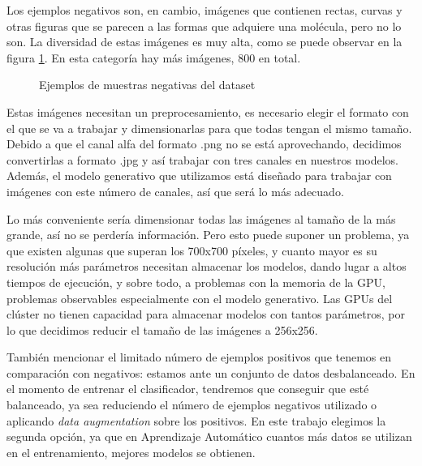 Los ejemplos negativos son, en cambio, imágenes que contienen rectas, curvas y otras figuras que se parecen a las formas que adquiere una molécula, pero no lo son. La diversidad de estas imágenes es muy alta, como se puede observar en la figura \ref{fig:negative_examples}. En esta categoría hay más imágenes, 800 en total.

\begin{figure}[H]
\centering
    \caption{Ejemplos de muestras negativas del dataset}
    \label{fig:negative_examples}
\end{figure}

Estas imágenes necesitan un preprocesamiento, es necesario elegir el formato con el que se va a trabajar y dimensionarlas para que todas tengan el mismo tamaño. Debido a que el canal alfa del formato .png no se está aprovechando, decidimos convertirlas a formato .jpg y así trabajar con tres canales en nuestros modelos. Además, el modelo generativo que utilizamos está diseñado para trabajar con imágenes con este número de canales, así que será lo más adecuado.

Lo más conveniente sería dimensionar todas las imágenes al tamaño de la más grande, así no se perdería información. Pero esto puede suponer un problema, ya que existen algunas que superan los 700x700 píxeles, y cuanto mayor es su resolución más parámetros necesitan almacenar los modelos, dando lugar a altos tiempos de ejecución, y sobre todo, a problemas con la memoria de la GPU, problemas observables especialmente con el modelo generativo. Las GPUs del clúster no tienen capacidad para almacenar modelos con tantos parámetros, por lo que decidimos reducir el tamaño de las imágenes a 256x256. 

También mencionar el limitado número de ejemplos positivos que tenemos en comparación con negativos: estamos ante un conjunto de datos desbalanceado. En el momento de entrenar el clasificador, tendremos que conseguir que esté balanceado, ya sea reduciendo el número de ejemplos negativos utilizado o aplicando \textit{data augmentation} sobre los positivos. En este trabajo elegimos la segunda opción, ya que en Aprendizaje Automático cuantos más datos se utilizan en el entrenamiento, mejores modelos se obtienen. 

